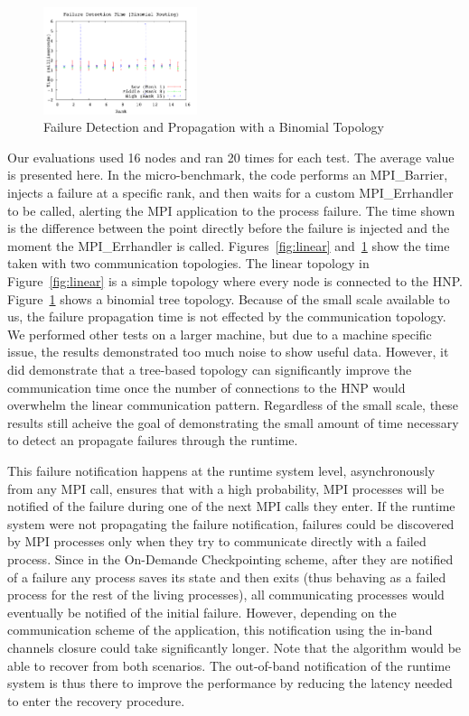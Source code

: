 \begin{figure}[htb]
    \centering
    \includegraphics[width=0.4\textwidth]{figures/failure_detection_binomial_errbars}
    \caption{Failure Detection and Propagation with a Binomial Topology}
    \label{fig:binomial}
\end{figure}

Our evaluations used 16 nodes and ran 20 times for each test. The average value
is presented here. In the micro-benchmark, the code performs an MPI\_Barrier,
injects a failure at a specific rank, and then waits for a custom
MPI\_Errhandler to be called, alerting the MPI application to the process
failure. The time shown is the difference between the point directly before the
failure is injected and the moment the MPI\_Errhandler is called.
Figures~\ref{fig:linear} and~\ref{fig:binomial} show the time taken with two
communication topologies.  The linear topology in Figure~\ref{fig:linear} is a
simple topology where every node is connected to the HNP.
Figure~\ref{fig:binomial} shows a binomial tree topology. Because of the small
scale available to us, the failure propagation time is not effected by the
communication topology. We performed other tests on a larger machine, but due to
a machine specific issue, the results demonstrated too much noise to show useful
data. However, it did demonstrate that a tree-based topology can significantly
improve the communication time once the number of connections to the HNP would
overwhelm the linear communication pattern. Regardless of the small scale, these
results still acheive the goal of demonstrating the small amount of time
necessary to detect an propagate failures through the runtime.

This failure notification happens at the runtime system level,
asynchronously from any MPI call, ensures that with a high
probability, MPI processes will be notified of the failure during one
of the next MPI calls they enter. If the runtime system were not
propagating the failure notification, failures could be discovered by
MPI processes only when they try to communicate directly with a failed
process. Since in the On-Demande Checkpointing scheme, after they are
notified of a failure any process saves its state and then exits (thus
behaving as a failed process for the rest of the living processes),
all communicating processes would eventually be notified of the
initial failure. However, depending on the communication scheme of the
application, this notification using the in-band channels closure
could take significantly longer. Note that the \abft algorithm would
be able to recover from both scenarios. The out-of-band notification
of the runtime system is thus there to improve the performance by
reducing the latency needed to enter the recovery procedure.


